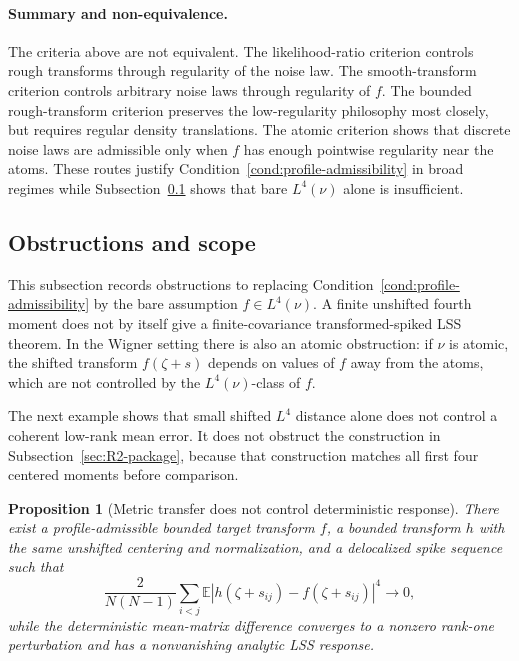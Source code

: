 \documentclass[10pt,a4paper]{amsart}
\newtheorem{proposition}[theorem]{Proposition}
\newcommand{\E}{\mathbb E}
\begin{document}
\paragraph{Summary and non-equivalence.}

The criteria above are not equivalent.  The likelihood-ratio criterion controls rough transforms through regularity of the noise law.  The smooth-transform criterion controls arbitrary noise laws through regularity of \(f\).  The bounded rough-transform criterion preserves the low-regularity philosophy most closely, but requires regular density translations.  The atomic criterion shows that discrete noise laws are admissible only when \(f\) has enough pointwise regularity near the atoms.  These routes justify Condition~\ref{cond:profile-admissibility} in broad regimes while Subsection~\ref{app:bare-L4-obstructions} shows that bare \(L^4(\nu)\) alone is insufficient.
\subsection{Obstructions and scope}
\label{app:bare-L4-obstructions}
\label{app:counterexample-W}

This subsection records obstructions to replacing Condition~\ref{cond:profile-admissibility} by the bare assumption \(f\in L^4(\nu)\).  A finite unshifted fourth moment does not by itself give a finite-covariance transformed-spiked LSS theorem.  In the Wigner setting there is also an atomic obstruction: if \(\nu\) is atomic, the shifted transform \(f(\zeta+s)\) depends on values of \(f\) away from the atoms, which are not controlled by the \(L^4(\nu)\)-class of \(f\).

The next example shows that small shifted \(L^4\) distance alone does not control a coherent low-rank mean error.  It does not obstruct the construction in Subsection~\ref{sec:R2-package}, because that construction matches all first four centered moments before comparison.

\begin{proposition}[Metric transfer does not control deterministic response]
\label{prop:E-metric-not-response}
There exist a profile-admissible bounded target transform \(f\), a bounded transform \(h\) with the same unshifted centering and normalization, and a delocalized spike sequence such that
\begin{equation}\label{eq:E-metric-zero}
        \frac{2}{N(N-1)}\sum_{i<j}
        \E|h(\zeta+s_{ij})-f(\zeta+s_{ij})|^4\longrightarrow0,
\end{equation}
while the deterministic mean-matrix difference converges to a nonzero rank-one perturbation and has a nonvanishing analytic LSS response.
\end{proposition}
\end{document}
